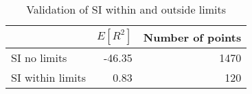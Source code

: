 
\begin{table}[H]
    \centering
    \caption{Validation of SI within and outside limits}
   \begin{tabular}{lrr}
\toprule
{} &  $E[R^2]$ &  Number of points \\
\midrule
SI no limits     &    -46.35 &              1470 \\
SI within limits &      0.83 &               120 \\
\bottomrule
\end{tabular}

    \label{tab:si_validation}
\end{table}
    